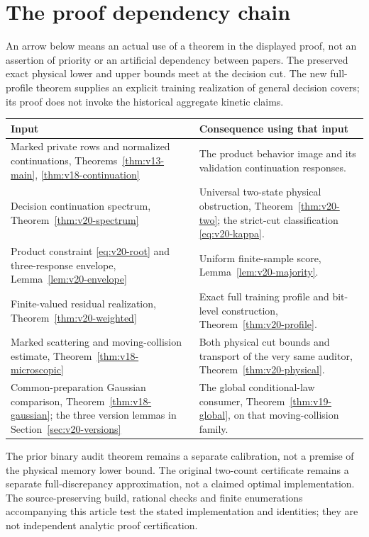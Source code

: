 \appendix
\section{The proof dependency chain}
\label{sec:v18-dependencies}
An arrow below means an actual use of a theorem in the displayed proof,
not an assertion of priority or an artificial dependency between papers.
The preserved exact physical lower and upper bounds meet at the decision cut. The new full-profile theorem supplies an explicit training realization of general decision covers; its proof does not invoke the historical aggregate kinetic claims.
\begin{center}
\begin{tabular}{p{}p{}}
\toprule
Input & Consequence using that input\\
\midrule
Marked private rows and normalized continuations,
Theorems~\ref{thm:v13-main}, \ref{thm:v18-continuation}
& The product behavior image and its validation continuation responses.\\[3pt]
Decision continuation spectrum,
Theorem~\ref{thm:v20-spectrum}
& Universal two-state physical obstruction,
Theorem~\ref{thm:v20-two}; the strict-cut classification
\eqref{eq:v20-kappa}.\\[3pt]
Product constraint \eqref{eq:v20-root} and three-response envelope,
Lemma~\ref{lem:v20-envelope}
& Uniform finite-sample score,
Lemma~\ref{lem:v20-majority}.\\[3pt]
Finite-valued residual realization,
Theorem~\ref{thm:v20-weighted}
& Exact full training profile and bit-level construction,
Theorem~\ref{thm:v20-profile}.\\[3pt]
Marked scattering and moving-collision estimate,
Theorem~\ref{thm:v18-microscopic}
& Both physical cut bounds and transport of the very same auditor,
Theorem~\ref{thm:v20-physical}.\\[3pt]
Common-preparation Gaussian comparison,
Theorem~\ref{thm:v18-gaussian}; the three version lemmas in
Section~\ref{sec:v20-versions}
& The global conditional-law consumer,
Theorem~\ref{thm:v19-global}, on that moving-collision family.\\
\bottomrule
\end{tabular}
\end{center}
The prior binary audit theorem remains a separate calibration, not a
premise of the physical memory lower bound. The original two-count
certificate remains a separate full-discrepancy approximation, not a
claimed optimal implementation. The source-preserving build, rational
checks and finite enumerations accompanying this article test the stated
implementation and identities; they are not independent analytic proof
certification.


